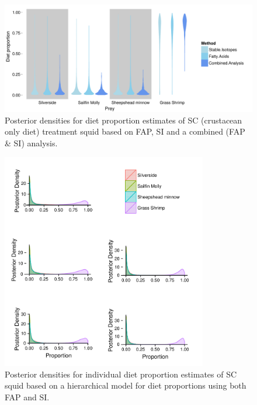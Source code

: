 \documentclass[fleqn,10pt]{wlpeerj}
\begin{document}
\begin{figure}
  \begin{center}
    \includegraphics[width=1\textwidth]{figures/Comp_plot_violin.pdf}
    \caption{Posterior densities for diet proportion estimates of SC (crustacean only diet)
      treatment squid based on FAP, SI and a combined (FAP \& SI) analysis.}
    \label{fig:pop_comp}
  \end{center}
\end{figure}


\begin{figure}
  \begin{center}
    \includegraphics[width=0.8\textwidth]{figures/Ind_FAP_SC_long.pdf}   
    \caption{Posterior densities for individual diet proportion
      estimates of SC squid based on a hierarchical
      model for diet proportions using both FAP and SI.}
    \label{fig:ind_est}
  \end{center}
\end{figure}
\end{document}
